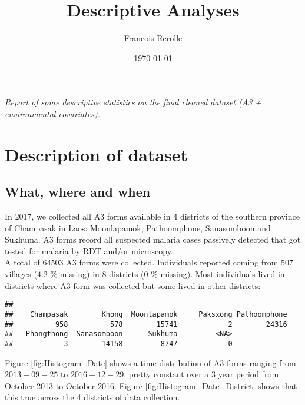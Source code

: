 \documentclass{article}\usepackage[]{graphicx}\usepackage[]{color}
\title{Descriptive Analyses}
\author{Francois Rerolle}
\date{\today}
\makeatletter
\newenvironment{kframe}{%
 \def\at@end@of@kframe{}%
 \ifinner\ifhmode%
  \def\at@end@of@kframe{\end{minipage}}%
  \begin{minipage}{\columnwidth}%
 \fi\fi%
 \def\FrameCommand##1{\hskip\@totalleftmargin \hskip-\fboxsep
 \colorbox{shadecolor}{##1}\hskip-\fboxsep
     \hskip-\linewidth \hskip-\@totalleftmargin \hskip\columnwidth}%
 \MakeFramed {\advance\hsize-\width
   \@totalleftmargin\z@ \linewidth\hsize
   \@setminipage}}%
 {\par\unskip\endMakeFramed%
 \at@end@of@kframe}
\newenvironment{knitrout}{}{} %
\makeatother
\begin{document}
\maketitle
 

\noindent \textit{Report of some descriptive statistics on the final cleaned dataset (A3 + environmental covariates).}


\section{Description of dataset}
\subsection{What, where and when}
In 2017, we collected all A3 forms available in 4 districts of the southern province of Champasak in Laos: Moonlapamok, Pathoomphone, Sanasomboon and Sukhuma. A3 forms record all suspected malaria cases passively detected that got tested for malaria by RDT and/or microscopy.\\

\noindent A total of \(64503\) A3 forms were collected. Individuals reported coming from \(507\) villages (\(4.2\) $\%$ missing) in \(8\) districts (\(0\) $\%$ missing). Most individuals lived in districts where A3 form was collected but some lived in other districts:\\

\begin{knitrout}
\color{fgcolor}\begin{kframe}
\begin{verbatim}
## 
##    Champasak        Khong  Moonlapamok     Paksxong Pathoomphone 
##          958          578        15741            2        24316 
##   Phongthong  Sanasomboon      Sukhuma         <NA> 
##            3        14158         8747            0
\end{verbatim}
\end{kframe}
\end{knitrout}

\noindent Figure \ref{fig:Histogram_Date} shows a time distribution of A3 forms ranging from \(2013-09-25\) to \(2016-12-29\), pretty constant over a 3 year period from October 2013 to October 2016. Figure \ref{fig:Histogram_Date_District} shows that this true across the 4 districts of data collection.
\end{document}
